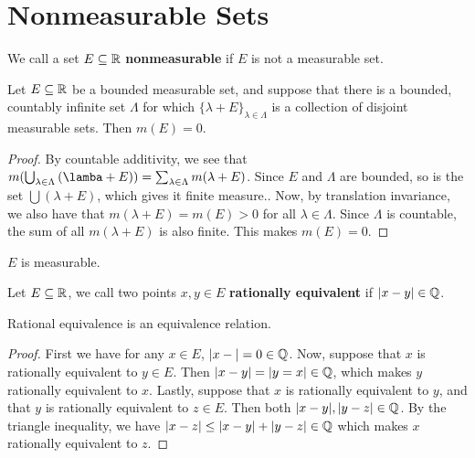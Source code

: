 
\section{Nonmeasurable Sets}

\begin{definition}
    We call a set $E \subseteq \mathbb{R}$  \textbf{nonmeasurable} if $E$ is not a
    measurable set.
\end{definition}

\begin{lemma}\label{8.5.1}
    Let $E \subseteq \mathbb{R}$ be a bounded measurable set, and suppose that there is
    a bounded, countably infinite set  $\Lambda$ for which
    $\{\lambda+E\}_{\lambda \in  \Lambda}$ is a collection of disjoint
    measurable sets. Then $m(E)=0$.
\end{lemma}
\begin{proof}
    By countable additivity, we see that $m(\bigcup_{\lambda \in
    \Lambda}{(\lamba+E)})=\sum_{\lambda \in \Lambda}{m(\lambda+E)}$. Since $E$
    and $\Lambda$ are bounded, so is the set  $\bigcup{(\lambda+E)}$, which
    gives it finite measure.. Now, by translation invariance, we also have that
     $m(\lambda+E)=m(E)>0$ for all $\lambda \in \Lambda$. Since  $\Lambda$ is
     countable, the sum of all $m(\lambda+E)$ is also finite. This makes
     $m(E)=0$.
\end{proof}
\begin{corollary}
   $E$ is measurable.
\end{corollary}

\begin{definition}
    Let $E \subseteq \mathbb{R}$, we call two points  $x,y \in E$  \textbf{rationally
    equivalent} if $|x-y| \in \mathbb{Q}$.
\end{definition}

\begin{lemma}\label{8.5.2}
    Rational equivalence is an equivalence relation.
\end{lemma}
\begin{proof}
    First we have for any $x \in E$,  $|x-|=0 \in \mathbb{Q}$. Now, suppose that  $x$ is
    rationally equivalent to $y \in E$. Then $|x-y|=|y=x| \in \mathbb{Q}$, which makes
    $y$ rationally equivalent to $x$. Lastly, suppose that $x$ is rationally
    equivalent to $y$, and that $y$ is rationally equivalent to $z \in E$. Then
    both $|x-y|,|y-z| \in \mathbb{Q}$. By the triangle inequality, we have  $|x-z| \leq
    |x-y|+|y-z| \in \mathbb{Q}$ which makes  $x$ rationally equivalent to $z$.
\end{proof}

